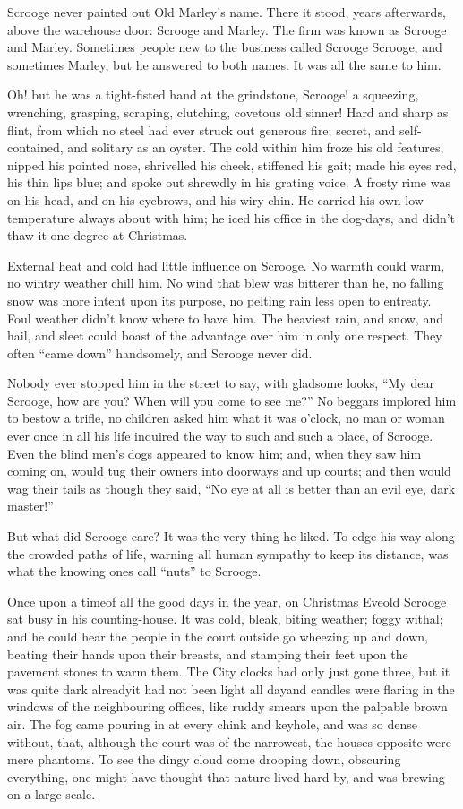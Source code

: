 \documentclass[paper=5.5in:8.5in,BCOR=10mm,twoside,DIV=15,12pt,usegeometry,openany]{scrbook} %
\begin{document}
Scrooge never painted out Old Marley's name. There it stood, years afterwards, above the warehouse door: Scrooge and Marley. The firm was known as Scrooge and Marley. Sometimes people new to the business called Scrooge Scrooge, and sometimes Marley, but he answered to both names. It was all the same to him.

Oh! but he was a tight-fisted hand at the grindstone, Scrooge! a squeezing, wrenching, grasping, scraping, clutching, covetous old sinner! Hard and sharp as flint, from which no steel had ever struck out generous fire; secret, and self-contained, and solitary as an oyster. The cold within him froze his old features, nipped his pointed nose, shrivelled his cheek, stiffened his gait; made his eyes red, his thin lips blue; and spoke out shrewdly in his grating voice. A frosty rime was on his head, and on his eyebrows, and his wiry chin. He carried his own low temperature always about with him; he iced his office in the dog-days, and didn't thaw it one degree at Christmas.

External heat and cold had little influence on Scrooge. No warmth could warm, no wintry weather chill him. No wind that blew was bitterer than he, no falling snow was more intent upon its purpose, no pelting rain less open to entreaty. Foul weather didn't know where to have him. The heaviest rain, and snow, and hail, and sleet could boast of the advantage over him in only one respect. They often \enquote{came down} handsomely, and Scrooge never did.

Nobody ever stopped him in the street to say, with gladsome looks, \enquote{My dear Scrooge, how are you? When will you come to see me?} No beggars implored him to bestow a trifle, no children asked him what it was o'clock, no man or woman ever once in all his life inquired the way to such and such a place, of Scrooge. Even the blind men's dogs appeared to know him; and, when they saw him coming on, would tug their owners into doorways and up courts; and then would wag their tails as though they said, \enquote{No eye at all is better than an evil eye, dark master!}

But what did Scrooge care? It was the very thing he liked. To edge his way along the crowded paths of life, warning all human sympathy to keep its distance, was what the knowing ones call \enquote{nuts} to Scrooge.

Once upon a time\textemdash of all the good days in the year, on Christmas Eve\textemdash old Scrooge sat busy in his counting-house. It was cold, bleak, biting weather; foggy withal; and he could hear the people in the court outside go wheezing up and down, beating their hands upon their breasts, and stamping their feet upon the pavement stones to warm them. The City clocks had only just gone three, but it was quite dark already\textemdash it had not been light all day\textemdash and candles were flaring in the windows of the neighbouring offices, like ruddy smears upon the palpable brown air. The fog came pouring in at every chink and keyhole, and was so dense without, that, although the court was of the narrowest, the houses opposite were mere phantoms. To see the dingy cloud come drooping down, obscuring everything, one might have thought that nature lived hard by, and was brewing on a large scale.
\end{document}
